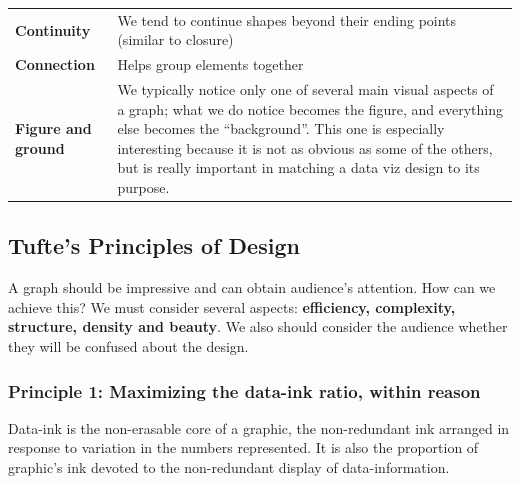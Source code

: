 \documentclass[]{book}
\begin{document}
\begin{longtable}[]{@{}ll@{}}
\begin{minipage}[t]{0.15\columnwidth}
\textbf{Continuity}\strut
\end{minipage} & \begin{minipage}[t]{0.79\columnwidth}\raggedright
We tend to continue shapes beyond their ending points (similar to closure)\strut
\end{minipage}\tabularnewline
\begin{minipage}[t]{0.15\columnwidth}\raggedright
\textbf{Connection}\strut
\end{minipage} & \begin{minipage}[t]{0.79\columnwidth}\raggedright
Helps group elements together\strut
\end{minipage}\tabularnewline
\begin{minipage}[t]{0.15\columnwidth}\raggedright
\textbf{Figure and ground}\strut
\end{minipage} & \begin{minipage}[t]{0.79\columnwidth}\raggedright
We typically notice only one of several main visual aspects of a graph; what we do notice becomes the figure, and everything else becomes the ``background''. This one is especially interesting because it is not as obvious as some of the others, but is really important in matching a data viz design to its purpose.\strut
\end{minipage}\tabularnewline
\bottomrule
\end{longtable}

\hypertarget{tuftes-principles-of-design}{%
\subsection{Tufte's Principles of Design}\label{tuftes-principles-of-design}}

A graph should be impressive and can obtain audience's attention. How can we achieve this? We must consider several aspects: \textbf{efficiency, complexity, structure, density and beauty}. We also should consider the audience whether they will be confused about the design.

\hypertarget{principle-1-maximizing-the-data-ink-ratio-within-reason}{%
\subsubsection{Principle 1: Maximizing the data-ink ratio, within reason}\label{principle-1-maximizing-the-data-ink-ratio-within-reason}}

Data-ink is the non-erasable core of a graphic, the non-redundant ink arranged in response to variation in the numbers represented. It is also the proportion of graphic's ink devoted to the non-redundant display of data-information.
\end{document}
